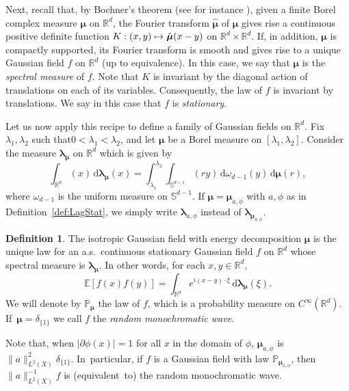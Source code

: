\documentclass[JEP,XML,SOM,Unicode,published]{cedram}
\newcommand\mto{\mathchoice{\longmapsto}{\mapsto}{\mapsto}{\mapsto}}
\newcommand{\rd}{\,\mathrm{d}}
\theoremstyle{plain}
\theoremstyle{definition}
\newtheorem{definition}[theorem]{Definition}
\newcommand{\R}{\mathbb{R}}
\newcommand{\E}{\mathbb{E}}
\begin{document}
Next, recall that, by Bochner's theorem (see for instance \cite[\S2.1.11]{CI}), given a finite Borel complex measure $\boldsymbol{\mu}$ on $\R^d$, the Fourier transform $\hat{\boldsymbol{\mu}}$
of $\boldsymbol{\mu}$ gives rise a continuous positive definite function $K:(x,y)\mto \hat{\boldsymbol{\mu}}(x-y)$ on $\R^d\times\R^d$. If, in addition, $\boldsymbol{\mu}$ is compactly supported, its Fourier transform is smooth and gives rise to a unique Gaussian field $f$ on $\R^d$ (up to equivalence). In this case, we say that $\boldsymbol{\mu}$ is the \emph{spectral measure} of $f$. Note that $K$ is invariant by the diagonal action of translations on each of its variables. Consequently, the law of $f$ is invariant by translations. We say in this case that $f$ is \emph{stationary}.

Let us now apply this recipe to define a family of Gaussian fields on $\R^d$. Fix $\lambda_1,\lambda_2$ such that$0<\lambda_1<\lambda_2$, and let $\boldsymbol{\mu}$ be a Borel measure on $[\lambda_1,\lambda_2]$. Consider the measure $\boldsymbol{\lambda_\mu}$ on $\mathbb{R}^d$ which is given by
\begin{equation}\label{eq:measure_def}
\int_{\R^d} (x) \rd \boldsymbol{\lambda_\mu}(x) = \int_{\lambda_1}^{\lambda_2} \int_{\mathbb{S}^{d-1}} (r y) \rd \omega_{d-1}(y) \rd \boldsymbol{\mu}(r),
\end{equation}
where $\omega_{d-1}$ is the uniform measure on $\mathbb{S}^{d-1}$. If $\boldsymbol{\mu}= \boldsymbol{\mu}_{a,\phi}$ with $a, \phi$ as
in Definition~\ref{def:LagStat}, we simply write $\boldsymbol{\lambda}_{a,\phi}$ instead of $\boldsymbol{\lambda}_{\boldsymbol{\mu}_{a,\phi}}$.

\begin{definition}\label{def:spm_to_field}
The isotropic Gaussian field with energy decomposition $\boldsymbol{\mu}$ is the unique law for an a.s.\ continuous stationary Gaussian field $f$ on $\R^d$ whose spectral measure is $\boldsymbol{\lambda_\mu}$. In other words, for each $x,y\in\R^d$,
\[
\E[f(x)f(y)]=\int_{\R^d}e^{i(x-y)\cdot\xi}\rd\boldsymbol{\lambda_\mu}(\xi).
\]
We will denote by $\mathbb{P}_{\boldsymbol{\mu}}$ the law of $f$, which is a probability measure on $C^\infty(\R^d)$. If~$\boldsymbol{\mu}=\delta_{\{1\}}$ we call $f$ the \emph{random monochromatic wave}.
\end{definition}

Note that, when $|\partial \phi(x)|=1$ for all $x$ in the domain of $\phi$, $\boldsymbol{\mu}_{a,\phi}$ is $\|a\|_{L^2(X)}^2\delta_{\{1\}}$. In~particular, if $f$ is a Gaussian field with law $\mathbb{P}_{\boldsymbol{\mu}_{a,\phi}}$, then $\|a\|_{L^2(X)}^{-1} f$ is (equivalent~to) the random monochromatic wave.
\end{document}
